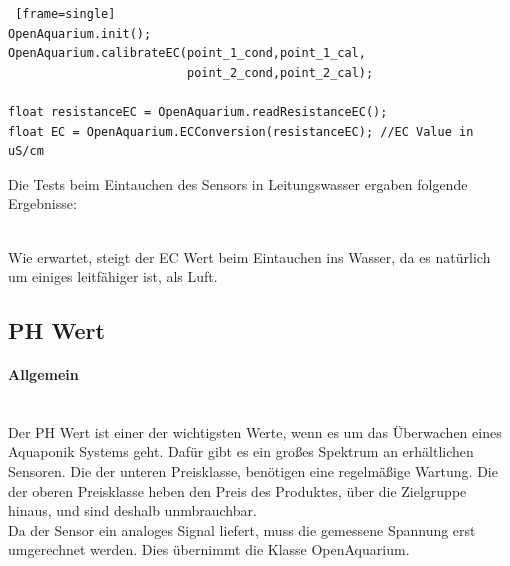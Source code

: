 \documentclass[11pt]{article}
\begin{document}
\begin{lstlisting} [frame=single]
OpenAquarium.init();
OpenAquarium.calibrateEC(point_1_cond,point_1_cal,
                         point_2_cond,point_2_cal);

float resistanceEC = OpenAquarium.readResistanceEC();
float EC = OpenAquarium.ECConversion(resistanceEC); //EC Value in uS/cm
\end{lstlisting}
Die Tests beim Eintauchen des Sensors in Leitungswasser ergaben folgende Ergebnisse: \\ \\
\begin{minipage}{5in}
  \centering
\end{minipage}
\vskip0.5cm
Wie erwartet, steigt der EC Wert beim Eintauchen ins Wasser, da es nat\"urlich um einiges leitf\"ahiger ist, als Luft.

\subsection{PH Wert}
\paragraph{Allgemein} \mbox{} \\
Der PH Wert ist einer der wichtigsten Werte, wenn es um das \"Uberwachen eines Aquaponik Systems geht. Daf\"ur gibt es ein gro{\ss}es Spektrum an erh\"altlichen Sensoren. Die der unteren Preisklasse, ben\"otigen eine regelm\"a{\ss}ige Wartung. Die der oberen Preisklasse heben den Preis des Produktes, \"uber die Zielgruppe hinaus, und sind deshalb unmbrauchbar. \\
Da der Sensor ein analoges Signal liefert, muss die gemessene Spannung erst umgerechnet werden. Dies \"ubernimmt die Klasse OpenAquarium.
\end{document}
